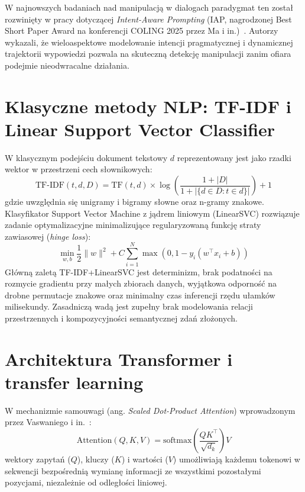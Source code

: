 \documentclass[12pt,a4paper,twoside]{report}
\begin{document}
W najnowszych badaniach nad manipulacją w dialogach paradygmat ten został rozwinięty w pracy dotyczącej \emph{Intent-Aware Prompting} (IAP, nagrodzonej Best Short Paper Award na konferencji COLING 2025 przez Ma i in.)~\cite{iap2025}. Autorzy wykazali, że wieloaspektowe modelowanie intencji pragmatycznej i dynamicznej trajektorii wypowiedzi pozwala na skuteczną detekcję manipulacji zanim ofiara podejmie nieodwracalne działania.

\section{Klasyczne metody NLP: TF-IDF i Linear Support Vector Classifier}
W klasycznym podejściu dokument tekstowy $d$ reprezentowany jest jako rzadki wektor w przestrzeni cech słownikowych:
\begin{equation}
  \mathrm{TF}\text{-}\mathrm{IDF}(t, d, D) = \mathrm{TF}(t, d) \times \log\left(\frac{1 + |D|}{1 + |\{d \in D : t \in d\}|}\right) + 1
\end{equation}
gdzie uwzględnia się unigramy i bigramy słowne oraz n-gramy znakowe. Klasyfikator Support Vector Machine z jądrem liniowym (LinearSVC) rozwiązuje zadanie optymalizacyjne minimalizujące regularyzowaną funkcję straty zawiasowej (\emph{hinge loss}):
\begin{equation}
  \min_{w, b} \frac{1}{2} \|w\|^2 + C \sum_{i=1}^N \max\left(0, 1 - y_i (w^\top x_i + b)\right)
\end{equation}
Główną zaletą TF-IDF+LinearSVC jest determinizm, brak podatności na rozmycie gradientu przy małych zbiorach danych, wyjątkowa odporność na drobne permutacje znakowe oraz minimalny czas inferencji rzędu ułamków milisekundy. Zasadniczą wadą jest zupełny brak modelowania relacji przestrzennych i kompozycyjności semantycznej zdań złożonych.

\section{Architektura Transformer i transfer learning}
W mechanizmie samouwagi (ang. \emph{Scaled Dot-Product Attention}) wprowadzonym przez Vaswaniego i in.~\cite{vaswani2017}:
\begin{equation}
  \mathrm{Attention}(Q, K, V) = \mathrm{softmax}\left(\frac{Q K^\top}{\sqrt{d_k}}\right) V
\end{equation}
wektory zapytań ($Q$), kluczy ($K$) i wartości ($V$) umożliwiają każdemu tokenowi w sekwencji bezpośrednią wymianę informacji ze wszystkimi pozostałymi pozycjami, niezależnie od odległości liniowej.
\end{document}
